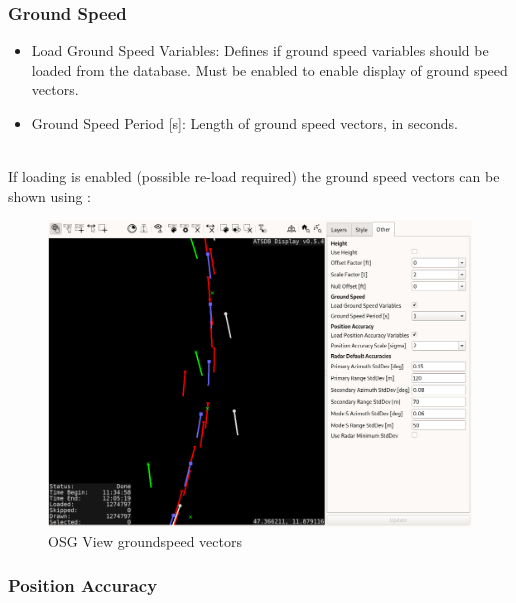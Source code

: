 \subsubsection{Ground Speed}
\label{sec:others_ground_speed}

\begin{itemize}
 \item Load Ground Speed Variables: Defines if ground speed variables should be loaded from the database. Must be enabled to enable display of ground speed vectors.
 \item Ground Speed Period [s]: Length of ground speed vectors, in seconds.
\end{itemize}
\ \\

If loading is enabled (possible re-load required) the ground speed vectors can be shown using :

\begin{figure}[H]
    \hspace*{-2.5cm}
    \includegraphics[width=19cm,frame]{../screenshots/osgview_groundspeed_vectors.png}
  \caption{OSG View groundspeed vectors}
\end{figure} 

\subsubsection{Position Accuracy}
\label{sec:others_position_accuracy}


